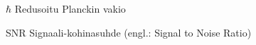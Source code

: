 
\begin{termiluettelo}

\item [$\hbar$] Redusoitu Planckin vakio
\item [SNR] Signaali-kohinasuhde (engl.: Signal to Noise Ratio)

\end{termiluettelo}